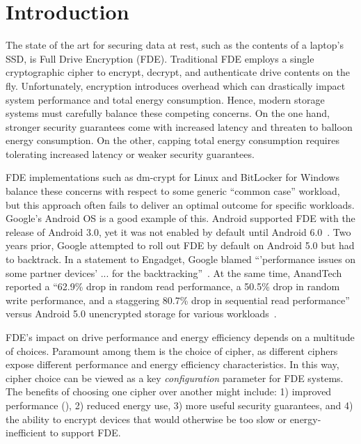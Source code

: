 \section{Introduction}\label{sec:introduction}

The state of the art for securing data at rest, such as the contents of a
laptop's SSD, is Full Drive Encryption (FDE). Traditional FDE employs a single
cryptographic cipher to encrypt, decrypt, and authenticate drive contents on the
fly. Unfortunately, encryption introduces overhead which can drastically impact
system performance and total energy consumption. Hence, modern storage systems
must carefully balance these competing concerns. On the one hand, stronger
security guarantees come with increased latency and threaten to balloon energy
consumption. On the other, capping total energy consumption requires tolerating
increased latency or weaker security guarantees.

FDE implementations such as dm-crypt for Linux and BitLocker for Windows balance
these concerns with respect to some generic ``common case'' workload, but
this approach often fails to deliver an optimal outcome for specific workloads.
Google's Android OS is a good example of this. Android supported FDE with the
release of Android 3.0, yet it was not enabled by default until Android
6.0~\cite{android-M-mobile-motivation}. Two years prior, Google attempted to
roll out FDE by default on Android 5.0 but had to backtrack. In a statement to
Engadget, Google blamed ``'performance issues on some partner devices' ... for
the backtracking''~\cite{google-engadget}. At the same time, AnandTech reported
a ``62.9\% drop in random read performance, a 50.5\% drop in random write
performance, and a staggering 80.7\% drop in sequential read performance''
versus Android 5.0 unencrypted storage for various
workloads~\cite{android-M-mobile-motivation-2}.

FDE's impact on drive performance and energy efficiency depends on a multitude
of choices. Paramount among them is the choice of cipher, as different ciphers
expose different performance and energy efficiency characteristics. In this way,
cipher choice can be viewed as a key \emph{configuration} parameter for FDE
systems. The benefits of choosing one cipher over another might include: 1)
improved performance (), 2) reduced energy
use, 3) more useful security guarantees, and 4) the ability to encrypt devices
that would otherwise be too slow or energy-inefficient to support FDE.

